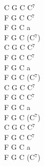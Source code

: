 \documentclass[a5paper, 10pt]{book}
\begin{document}
\begin{minipage}[t]{0.2\textwidth}
 C G C C$^7$\\
 F G C C$^7$\\
 F G C a\\
 F G C (C$^7$)\\

 C G C C$^7$\\
F G C C$^7$\\
F G C a\\
F G C (C$^7$)\\

C G C C$^7$\\
F G C C$^7$\\
F G C a\\
F G C (C$^7$)\\

C G C C$^7$\\
F G C C$^7$\\
F G C a\\
F G C (C$^7$)\\
\end{minipage}


\newpage
\end{document}

